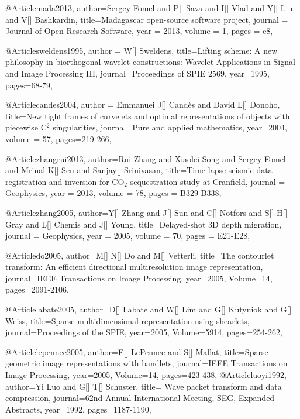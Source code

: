 @Article{mada2013,
  author={Sergey Fomel and P[] Sava and I[] Vlad and Y[] Liu and V[] Bashkardin},
  title={Madagascar open-source software project},
  journal = 	 {Journal of Open Research Software},
  year = 	 2013,
  volume =	 1,
  pages =	 {e8},
}

@Article{sweldens1995,
  author = {W[] Sweldens},
  title={Lifting scheme: A new philosophy in biorthogonal wavelet constructions: Wavelet Applications in Signal and Image Processing III},
  journal={Proceedings of SPIE 2569},
  year=1995,
  pages={68-79},
}

@Article{candes2004,
  author = {Emmanuei J[] Cand\`{e}s and David L[] Donoho},
  title={New tight frames of curvelets and optimal representations of objects with piecewise {C}$^2$ singularities},
  journal={Pure and applied mathematics},
  year=2004,
  volume =	 57,
  pages={219-266},
}


@Article{zhangrui2013,
  author={Rui Zhang and Xiaolei Song and Sergey Fomel and Mrinal K[] Sen and Sanjay[] Srinivasan},
  title={Time-lapse seismic data registration and inversion for {CO}$_2$ sequestration study at Cranfield},
  journal = 	 {Geophysics},
  year = 	 2013,
  volume =	 78,
  pages =	 {B329-B338},
}

@Article{zhang2005,
  author={Y[] Zhang and J[] Sun and C[] Notfors and S[] H[] Gray and L[] Chemis and J[] Young},
  title={Delayed-shot 3{D} depth migration},
  journal = 	 {Geophysics},
  year = 	 2005,
  volume =	 70,
  pages =	 {E21-E28},
}

@Article{do2005,
  author={M[] N[] Do and M[] Vetterli},
  title={The contourlet transform: An efficient directional multiresolution image representation},
  journal={IEEE Transactions on Image Processing},
  year=2005,
  Volume=14,
  pages={2091-2106},
}

@Article{labate2005,
  author={D[] Labate and W[] Lim and G[] Kutyniok and G[] Weiss},
  title={Sparse multidimensional representation using shearlets},
  journal={Proceedings of the SPIE},
  year=2005,
  Volume=5914,
  pages={254-262},
}

@Article{lepennec2005,
  author={E[] LePennec and S[] Mallat},
  title={Sparse geometric image representations with bandlets},
  journal={IEEE Transactions on Image Processing},
  year=2005,
  Volume=14,
  pages={423-438},
}
@Article{luoyi1992,
  author={Yi Luo and G[] T[] Schuster},
  title={	Wave packet transform and data compression},
  journal={62nd Annual International Meeting, SEG, Expanded Abstracts},
  year=1992,
  pages={1187-1190},
}

